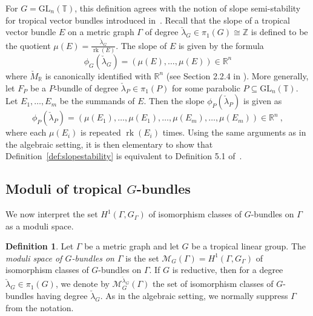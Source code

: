 \documentclass[10pt, a4paper]{amsart}
\theoremstyle{definition}
\newtheorem{definition}[theorem]{Definition}
\theoremstyle{myitemstyle}
\newcommand{\R}{\mathbb{R}}
\newcommand{\Z}{\mathbb{Z}}
\newcommand{\TT}{\mathbb{T}}
\newcommand{\T}{\mathbb{T}}
\newcommand{\Mcheck}{{\check{M}}}
\newcommand{\lambdacheck}{\check{\lambda}}
\newcommand{\calM}{\mathcal{M}}
\DeclareMathOperator{\rk}{rk}
\newcommand{\GL}{{\mathrm{GL}}}
\newcommand{\Ga}{\Gamma}
\begin{document}
For $G = \GL_n(\TT)$, this definition agrees with the notion of slope semi-stability for tropical vector bundles introduced in~\cite{2022GrossUlirschZakharov}. Recall that the slope of a tropical vector bundle $E$ on a metric graph $\Gamma$ of degree $\lambdacheck_G \in \pi_1(G)\cong\Z$ is defined to be the quotient $\mu(E) = \frac{\lambdacheck_G}{\rk(E)}$. The slope of $E$ is given by the formula
\[
\phi_G(\lambdacheck_G) = (\mu(E),\ldots,\mu(E)) \in \R^n
\]
where $\Mcheck_\R$ is canonically identified with $\R^n$ (see Section 2.2.4 in  \cite{schieder2015harder}). More generally, let $F_P$ be a $P$-bundle of degree $\lambdacheck_P \in \pi_1(P)$ for some parabolic $P \subseteq \GL_n(\T)$. Let $E_1,\ldots, E_m$ be the summands of $E$.
Then the slope $\phi_P(\lambdacheck_P)$ is given as
\[
\phi_P(\lambdacheck_P) = (\mu(E_1),\ldots,\mu(E_1),\ldots,\mu(E_m),\ldots,\mu(E_m)) \in \R^n \ ,
\]
where each $\mu(E_i)$ is repeated $\rk(E_i)$ times. Using the same arguments as in the algebraic setting, it is then elementary to show that Definition~\ref{def:slopestability} is equivalent to Definition 5.1 of~\cite{2022GrossUlirschZakharov}.










\subsection{Moduli of tropical $G$-bundles} We now interpret the set $H^1(\Gamma,G_{\Gamma})$ of isomorphism classes of $G$-bundles on $\Gamma$ as a moduli space. 

\label{subsec:moduli}

\begin{definition} Let $\Ga$ be a metric graph and let $G$ be a tropical linear group. The \emph{moduli space of $G$-bundles on $\Gamma$} is the set $\calM_G(\Ga)=H^1(\Gamma,G_{\Gamma})$ of isomorphism classes of $G$-bundles on $\Ga$. If $G$ is reductive, then for a degree $\lambdacheck_G\in \pi_1(G)$, we denote by $\calM^{\lambdacheck_G}_G(\Ga)$ the set of isomorphism classes of $G$-bundles having degree $\lambdacheck_G$. As in the algebraic setting, we normally suppress $\Ga$ from the notation. 
\end{definition}
\end{document}
